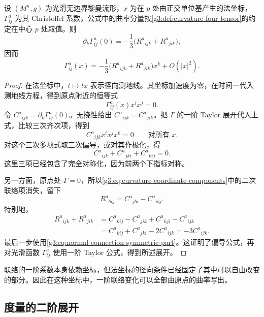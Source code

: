 \begin{proposition}\label{g3:prop:normal-connection-expansion}
	设 \((M^n,g)\) 为光滑无边界黎曼流形，\(x\) 为在 \(p\) 处由正交单位基产生的法坐标，\(\Gamma^a_{ij}\) 为其 Christoffel 系数，公式中的曲率分量按\cref{g3:def:curvature-four-tensor}的约定在中心 \(p\) 处取值。则
	\begin{equation}\label{g3:eq:normal-connection-derivative}
		\partial_k\Gamma^a_{ij}(0)
		=-\frac13\bigl(R^a{}_{i j k}+R^a{}_{j i k}\bigr),
	\end{equation}
	因而
	\begin{equation}\label{g3:eq:normal-connection-expansion}
		\Gamma^a_{ij}(x)
		=-\frac13\bigl(R^a{}_{i j k}+R^a{}_{j i k}\bigr)x^k
		+O(|x|^2).
	\end{equation}
\end{proposition}
\begin{proof}
	在法坐标中，\(t\mapsto tx\) 表示径向测地线。其坐标加速度为零，在时间一代入测地线方程，得到原点附近的恒等式
	\[
		\Gamma^a_{ij}(x)x^ix^j=0.
	\]
	令 \(C^a{}_{ij k}=\partial_k\Gamma^a_{ij}(0)\)。无挠性给出 \(C^a{}_{ij k}=C^a{}_{ji k}\)。把 \(\Gamma\) 的一阶 Taylor 展开代入上式，比较三次齐次项，得到
	\[
		C^a{}_{ij k}x^ix^jx^k=0\qquad\text{对所有 }x.
	\]
	对这个三次多项式取三次偏导，或对其作极化，得
	\begin{equation}\label{g3:eq:normal-connection-symmetric-part}
		C^a{}_{ij k}+C^a{}_{jk i}+C^a{}_{ki j}=0.
	\end{equation}
	这里三项已经包含了完全对称化，因为前两个下指标对称。

	另一方面，原点处 \(\Gamma=0\)，所以\eqref{g3:eq:curvature-coordinate-components}中的二次联络项消失，留下
	\[
		R^a{}_{b i j}=C^a{}_{jb i}-C^a{}_{ib j}.
	\]
	特别地，
	\[
		\begin{aligned}
			R^a{}_{i j k}+R^a{}_{j i k}
			&=C^a{}_{ki j}-C^a{}_{ji k}
			+C^a{}_{kj i}-C^a{}_{ij k}\\
			&=C^a{}_{ki j}+C^a{}_{jk i}-2C^a{}_{ij k}
			=-3C^a{}_{ij k}.
		\end{aligned}
	\]
	最后一步使用\eqref{g3:eq:normal-connection-symmetric-part}。这证明了偏导公式，再对光滑函数 \(\Gamma^a_{ij}\) 使用一阶 Taylor 公式，得到所述展开。
\end{proof}

联络的一阶系数本身依赖坐标，但法坐标的径向条件已经固定了其中可以自由改变的部分。因此在这种坐标中，一阶联络变化可以全部由原点的曲率写出。

\subsection{度量的二阶展开}
\label{g3:subsec:0303:02}

